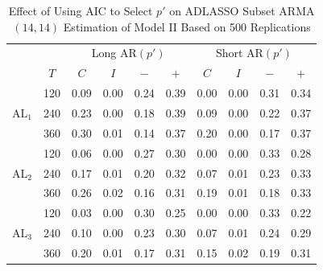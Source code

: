 \begin{table}[htbp]
\caption{Effect of Using AIC to Select $p'$ on ADLASSO Subset ARMA$(14,14)$ Estimation of Model II Based on 500 Replications}
\centering
\begin{tabular}{cc|cccc|cccc}
  \hline
    & & \multicolumn{4}{c|}{Long AR$(p')$} & \multicolumn{4}{c}{Short AR$(p')$} \\
      \cline{4-5}  \cline{8-9}
  & $T$ & $C$ & $I$ & $-$ & $+$ & $C$ & $I$ & $-$ & $+$\\
  \hline
  \multirow{3}{*}{$\textrm{AL}_1$} & 120 & 0.09 & 0.00 & 0.24 & 0.39 & 0.00 & 0.00 & 0.31 & 0.34 \\ 
  & 240 & 0.23 & 0.00 & 0.18 & 0.39 & 0.09 & 0.00 & 0.22 & 0.37 \\ 
  & 360 & 0.30 & 0.01 & 0.14 & 0.37 & 0.20 & 0.00 & 0.17 & 0.37 \\ 
  \hline
  \multirow{3}{*}{$\textrm{AL}_2$} & 120 & 0.06 & 0.00 & 0.27 & 0.30 & 0.00 & 0.00 & 0.33 & 0.28 \\ 
  & 240 & 0.17 & 0.01 & 0.20 & 0.32 & 0.07 & 0.01 & 0.23 & 0.33 \\ 
  & 360 & 0.26 & 0.02 & 0.16 & 0.31 & 0.19 & 0.01 & 0.18 & 0.33 \\ 
  \hline
  \multirow{3}{*}{$\textrm{AL}_3$} & 120 & 0.03 & 0.00 & 0.30 & 0.25 & 0.00 & 0.00 & 0.33 & 0.22 \\ 
  & 240 & 0.10 & 0.00 & 0.23 & 0.30 & 0.07 & 0.01 & 0.24 & 0.29 \\ 
  & 360 & 0.20 & 0.01 & 0.17 & 0.31 & 0.15 & 0.02 & 0.19 & 0.31 \\ 
   \hline
\end{tabular}
\label{tab:longvsshort2}
\end{table}

